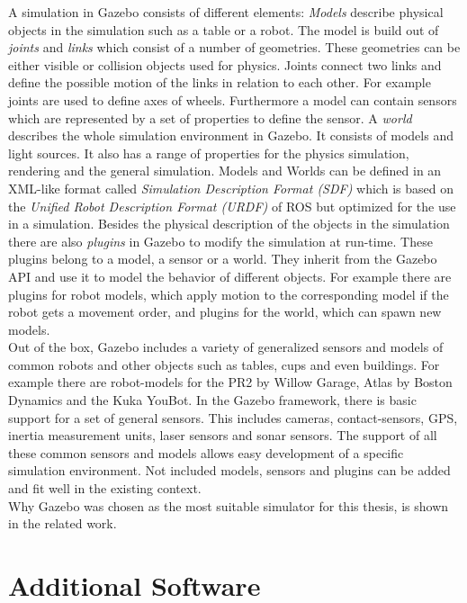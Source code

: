 A simulation in Gazebo consists of different elements: \textit{Models} describe physical objects in the simulation such as a table or a robot. The model is build out of \textit{joints} and \textit{links} which consist of a number of geometries. These geometries can be either visible or collision objects used for physics. Joints connect two links and define the possible motion of the links in relation to each other. For example joints are used to define axes of wheels. Furthermore a model can contain sensors which are represented by a set of properties to define the sensor. A \textit{world} describes the whole simulation environment in Gazebo. It consists of models and light sources. It also has a range of properties for the physics simulation, rendering and the general simulation. Models and Worlds can be defined in an XML-like format called \textit{Simulation Description Format (SDF)} which is based on the \textit{Unified Robot Description Format (URDF)} of ROS but optimized for the use in a simulation. Besides the physical description of the objects in the simulation there are also \textit{plugins} in Gazebo to modify the simulation at run-time. These plugins belong to a model, a sensor or a world. They inherit from the Gazebo API and use  it to model the behavior of different objects. For example there are plugins for robot models, which apply motion to the corresponding model if the robot gets a movement order, and plugins for the world, which can spawn new models.\\
Out of the box, Gazebo includes a variety of generalized sensors and models of common robots and other objects such as tables, cups and even buildings. For example there are robot-models for the PR2 by Willow Garage, Atlas by Boston Dynamics and the Kuka YouBot. In the Gazebo framework, there is basic support for a set of general sensors. This includes cameras, contact-sensors, GPS, inertia measurement units, laser sensors and sonar sensors. The support of all these common sensors and models allows easy development of a specific simulation environment. Not included models, sensors and plugins can be added and fit well in the existing context.\\
Why Gazebo was chosen as the most suitable simulator for this thesis, is shown in the related work.


\section{Additional Software}
